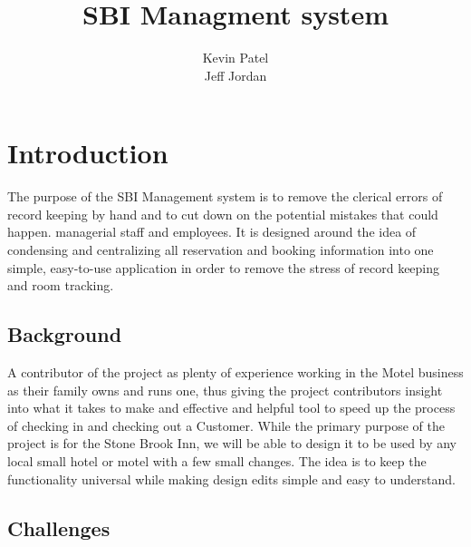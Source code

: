 \documentclass[10pt,conference,onecolumn,compsoc]{IEEEtran}
\begin{document}
\title{SBI Managment system}


\author{Kevin Patel\\Jeff Jordan
}

\maketitle

\IEEEdisplaynontitleabstractindextext

\IEEEpeerreviewmaketitle



\section{Introduction}

The purpose of the SBI Management system is to remove the clerical errors of record keeping by hand and to cut down on the potential mistakes that could happen.
managerial staff and employees. It is designed around the idea of condensing and centralizing all reservation and booking information into one simple, easy-to-use application in order to remove the stress of record keeping and room tracking. 



\subsection{Background}
A contributor of the project as plenty of experience working in the Motel business as their family owns and runs one, thus giving the project contributors insight into what it takes to make and effective and helpful tool to speed up the process of checking in and checking out a Customer. 
While the primary purpose of the project is for the Stone Brook Inn, we will be able to design it to be used by any local small hotel or motel with a few small changes. The idea is to keep the functionality universal while making design edits simple and easy to understand. 

\subsection{Challenges}
\end{document}

